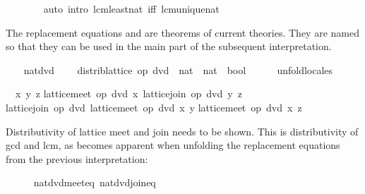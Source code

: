\begin{isabellebody}
\ \ \ \ \ \ \isamarkupfalse%
\ {\isacharparenleft}auto\ intro{\isacharcolon}\ lcm{\isacharunderscore}least{\isacharunderscore}nat\ iff{\isacharcolon}\ lcm{\isacharunderscore}unique{\isacharunderscore}nat{\isacharparenright}\isanewline
\ \ \ \ \ \ \isamarkupfalse%
\isanewline
\ \ \isamarkupfalse%
%
\endisatagproof
{\isafoldproof}%
%
\isadelimproof
%
\endisadelimproof
%
\begin{isamarkuptext}%
The replacement equations  and
   are theorems of current theories.
  They are named so that they can be used in the main part of the
  subsequent interpretation.%
\end{isamarkuptext}%
\isamarkuptrue%
%
\isadelimvisible
\ \ %
\endisadelimvisible
%
\isatagvisible
{}\isamarkupfalse%
\ nat{\isacharunderscore}dvd{\isacharcolon}\isanewline
\ \ \ \ distrib{\isacharunderscore}lattice\ {\isachardoublequoteopen}op\ dvd\ {\isacharcolon}{\isacharcolon}\ nat\ {\isasymRightarrow}\ nat\ {\isasymRightarrow}\ bool{\isachardoublequoteclose}\isanewline
\ \ \ \ \isamarkupfalse%
\ unfold{\isacharunderscore}locales%
\begin{isamarkuptxt}%
\normalsize \begin{isabelle}%
\ {}{\isachardot}\ {\isasymAnd}x\ y\ z{\isachardot}\isanewline
{}lattice{\isachardot}meet\ op\ dvd\ x\ {\isacharparenleft}lattice{\isachardot}join\ op\ dvd\ y\ z{\isacharparenright}\ {\isacharequal}\isanewline
{}lattice{\isachardot}join\ op\ dvd\ {\isacharparenleft}lattice{\isachardot}meet\ op\ dvd\ x\ y{\isacharparenright}\isanewline
{}lattice{\isachardot}meet\ op\ dvd\ x\ z{\isacharparenright}%
\end{isabelle}
      Distributivity of lattice meet and join needs to be shown.  This is
      distributivity of gcd and lcm, as becomes apparent when unfolding
      the replacement equations from the previous interpretation:%
\end{isamarkuptxt}%
\isamarkuptrue%
\ \ \ \ \isamarkupfalse%
\ nat{\isacharunderscore}dvd{\isacharunderscore}meet{\isacharunderscore}eq\ nat{\isacharunderscore}dvd{\isacharunderscore}join{\isacharunderscore}eq%
\begin{isamarkuptxt}%

\end{isamarkuptxt}
\end{isabellebody}
